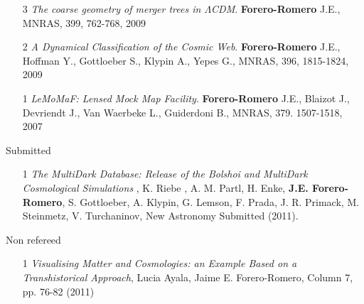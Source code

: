 \documentclass[9pt]{article}
\begin{document}
\begin{enumerate}
\item [3]
{\it The coarse geometry of merger trees in
  $\Lambda$CDM}.  {\bf Forero-Romero} J.E., 
MNRAS, 399, 762-768, 2009

\item [2]
{\it A Dynamical Classification of the  Cosmic Web}.  {\bf Forero-Romero} J.E., Hoffman Y.,  Gottloeber S., Klypin A., Yepes G.,
MNRAS, 396, 1815-1824, 2009

\item [1] 
{\it {\sc LeMoMaF}:  Lensed Mock Map Facility}. 
{\bf Forero-Romero} J.E., Blaizot J., Devriendt J., Van Waerbeke L., Guiderdoni B., 
MNRAS, 379. 1507-1518, 2007
\end{enumerate}

Submitted
\begin{enumerate}

\item[1]{\it The MultiDark Database: Release of the Bolshoi and MultiDark Cosmological Simulations} , K. Riebe , A. M. Partl, H. Enke, {\bf J.E. Forero-Romero}, S. Gottloeber, A. Klypin, G. Lemson, F. Prada, J. R. Primack, M. Steinmetz, V. Turchaninov, New Astronomy Submitted (2011).

\end{enumerate}



Non refereed 
\begin{enumerate}
\item[1] {\it Visualising Matter and Cosmologies: an Example Based on a Transhistorical Approach}, Lucia Ayala, Jaime E. Forero-Romero,  Column 7, pp. 76-82 (2011)
\end{enumerate}
\end{document}

